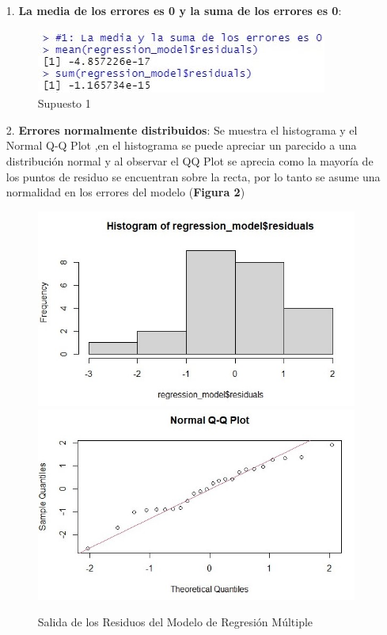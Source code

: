 \documentclass[a4paper,10pt,twocolumn]{article}
\begin{document}
\begin{enumerate}
	\item[1.] \textbf{La media de los errores es 0 y la suma de los errores es 0}:

\begin{figure}[h]
	\includegraphics[scale=0.8]{./imgs/reg_1.jpg}
	\caption{Supuesto 1}
\end{figure}

	
	\item[2.] \textbf{Errores normalmente distribuidos}:
	Se muestra el histograma y el Normal Q-Q Plot ,en el histograma se puede apreciar un parecido a una distribuci\'on normal y al observar el QQ Plot se aprecia como la mayoría de los puntos de residuo se encuentran sobre la recta, por lo tanto se asume una normalidad en los errores del modelo (\textbf{Figura 2})
	
	\begin{figure}[h]
		\includegraphics[scale=0.5]{./imgs/reg_2_hist.jpg}
		\includegraphics[scale=0.5]{./imgs/reg_2_qq.jpg}
		\caption{Salida de los Residuos del Modelo de Regresión Múltiple}
	\end{figure}
	

\end{enumerate}
\end{document}
